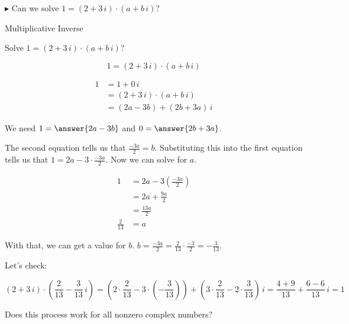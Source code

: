 \documentclass{ximera}
\begin{document}
 $\blacktriangleright$ Can we solve $1 = (2 + 3 \, i) \cdot (a + b \, i)  $?



\begin{example} Multiplicative Inverse


Solve $1 = (2 + 3 \, i) \cdot (a + b \, i)  $?


\begin{explanation}

\[   1 = (2 + 3 \, i) \cdot (a + b \, i)       \]



\begin{align*}
1     & = 1 + 0 \, i  \\
      & =    (2 + 3 \, i) \cdot (a + b \, i)   \\
      & =    (2a - 3b) + (2b+3a) \, i   
\end{align*}


We need $1 = \answer{2a - 3b}$ and $0 = \answer{2b+3a}$.


The second  equation tells us that $\frac{-3a}{2} = b$.  Substituting this into the first equation tells us that $1 = 2a - 3 \cdot \frac{-3a}{2}$.  Now we can solve for $a$.



\begin{align*}
1     & = 2a - 3 \left( \frac{-3a}{2} \right)  \\
      & =   2a + \frac{9a}{2}   \\
      & =    \frac{13a}{2}   \\
  \frac{2}{13}    & =  a
\end{align*}




With that, we can get a value for $b$.   $ b = \frac{-3a}{2} = \frac{2}{13}  \cdot \frac{-3}{2} = -\frac{3}{13}$.

Let's check:



\[    (2 + 3 \, i) \cdot \left(\frac{2}{13} - \frac{3}{13} \, i \right)     =   \left( 2 \cdot  \frac{2}{13} - 3 \cdot \left(- \frac{3}{13}\right)\right)  + \left( 3 \cdot \frac{2}{13} - 2 \cdot \frac{3}{13} \right) \, i = \frac{4+9}{13} + \frac{6-6}{13} \, i = 1  \]



\end{explanation}



\end{example}


Does this process work for all nonzero complex numbers? \\
\end{document}

